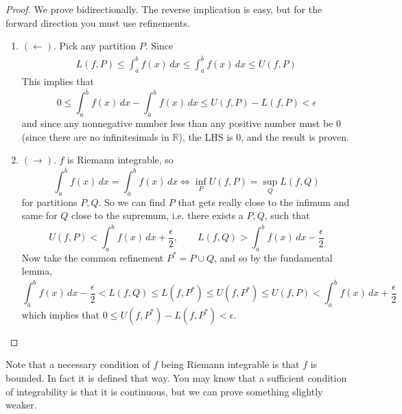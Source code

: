   \begin{proof}
    We prove bidirectionally. The reverse implication is easy, but for the forward direction you must use refinements. 
    \begin{enumerate}
      \item $(\leftarrow)$. Pick any partition $P$. Since
        \begin{align}
          L(f, P) \leq \int_{\bar{a}}^b f(x) \, dx \leq \int_a^{\bar{b}} f(x)\,dx \leq U(f, P)
        \end{align}
        This implies that 
        \begin{equation}
          0 \leq \int_a^{\bar{b}} f(x)\,dx - \int_{\bar{a}}^b f(x) \, dx \leq U(f, P) - L(f, P) < \epsilon 
        \end{equation}
        and since any nonnegative number less than any positive number must be $0$ (since there are no infinitesimals in $\mathbb{R}$), the LHS is $0$, and the result is proven.  

      \item $(\rightarrow)$. $f$ is Riemann integrable, so  
        \begin{equation}
          \int_a^{\bar{b}} f(x) \,dx = \int_{\bar{a}}^{b} f(x) \,dx \iff \inf_P U(f, P) = \sup_{Q} L(f, Q) 
        \end{equation}
        for partitions $P, Q$. So we can find $P$ that gets really close to the infimum and same for $Q$ close to the supremum, i.e. there exists a $P, Q$, such that
        \begin{equation}
          U(f, P) < \int_a^{\bar{b}} f(x) \,dx + \frac{\epsilon}{2}, \qquad L(f, Q) > \int_{\bar{a}}^b f(x) \,dx - \frac{\epsilon}{2}
        \end{equation}
        Now take the common refinement $P^\ast = P \cup Q$, and so by the fundamental lemma, 
        \begin{equation}
          \int_{\bar{a}}^b f(x) \,dx - \frac{\epsilon}{2} < L(f, Q) \leq L(f, P^\ast) \leq U(f, P^\ast) \leq U(f, P) < \int_a^{\bar{b}} f(x) \,dx + \frac{\epsilon}{2}
        \end{equation} 
        which implies that $0 \leq U(f, P^\ast) - L(f, P^\ast) < \epsilon$. 
    \end{enumerate}
  \end{proof}  

  Note that a necessary condition of $f$ being Riemann integrable is that $f$ is bounded. In fact it is defined that way. You may know that a sufficient condition of integrability is that it is continuous, but we can prove something slightly weaker. 

